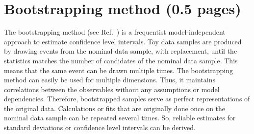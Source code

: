 
\section{Bootstrapping method (0.5 pages)}
\label{sec:dataanalysis:bootstrapping}

The bootstrapping method (see \eg Ref.~\cite{Behnke:2013pga}) is a frequentist
model-independent approach to estimate confidence level intervals. Toy data
samples are produced by drawing events from the nominal data sample, with
replacement, until the statistics matches the number of candidates of the
nominal data sample. This means that the same event can be drawn multiple
times. The bootstrapping method can easily be used for multiple dimensions.
Thus, it maintains correlations between the observables without any
assumptions or model dependencies. Therefore, bootstrapped samples serve as
perfect representations of the original data. Calculations or fits that are
originally done once on the nominal data sample can be repeated several times.
So, reliable estimates for standard deviations or confidence level intervals
can be derived.
